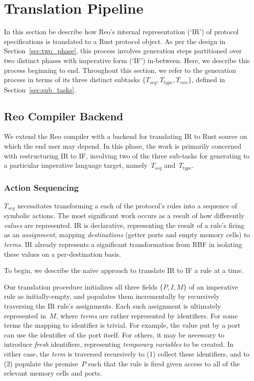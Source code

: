 \section{Translation Pipeline}
In this section be describe how Reo's internal representation (`IR') of protocol specifications is translated to a Rust protocol object. As per the design in Section~\ref{sec:two_phase}, this process involves generation steps partitioned over two distinct phases with imperative form (`IF') in-between. Here, we describe this process beginning to end. Throughout this section, we refer to the generation process in terms of its three distinct subtasks $\{T_{seq}, T_{type}, T_{run}\}$, defined in Section~\ref{sec:sub_tasks}.

\subsection{Reo Compiler Backend}
\label{sec:translation_phase_1}
We extend the Reo compiler with a backend for translating IR to Rust source on which the end user may depend. In this phase, the work is primarily concerned with restructuring IR to IF, involving two of the three sub-tasks for generating to a particular imperative language target, namely~$T_{seq}$ and~$T_{type}$. 

\subsubsection{Action Sequencing}
$T_{seq}$ necessitates transforming a each of the protocol's rules into a sequence of symbolic actions. The most significant work occurs as a result of how differently \textit{values} are represented. IR is declarative, representing the result of a rule's firing as an \textit{assignment}, mapping \textit{destinations} (getter ports and empty memory cells) to \textit{terms}. IR already represents a significant transformation from RBF in isolating these values on a per-destination basis. 

To begin, we describe the na\"ive approach to translate IR to IF a rule at a time.

Our translation procedure initializes all three fields $\{P, I, M\}$ of an imperative rule as initially-empty, and populates them incrementally by recursively traversing the IR rule's assignments. Each such assignment is ultimately represented in~$M$, where \textit{terms} are rather represented by identifiers. For some terms the mapping to identifier is trivial. For example, the value put by a port can use the identifier of the port itself. For others, it may be necessary to introduce \textit{fresh} identifiers, representing \textit{temporary variables} to be created. In either case, the \textit{term} is traversed recursively to (1) collect these identifiers, and to (2) populate the premise~$P$ such that the rule is fired given access to all of the relevant memory cells and ports.


